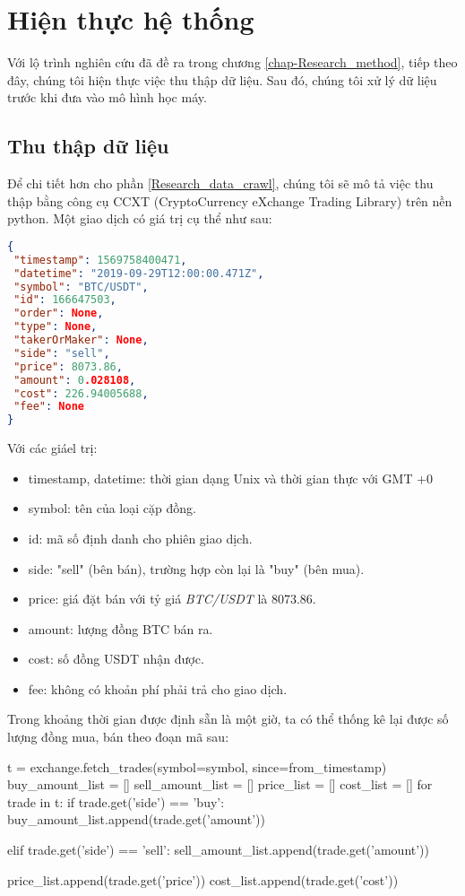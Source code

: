 \chapter{Hiện thực hệ thống}\label{chap:Implement}
Với lộ trình nghiên cứu đã đề ra trong chương \ref{chap-Research_method}, tiếp theo đây, chúng tôi hiện thực việc thu thập dữ liệu. Sau đó, chúng tôi xử lý dữ liệu trước khi đưa vào mô hình học máy.
\section{Thu thập dữ liệu}

Để chi tiết hơn cho phần \ref{Research_data_crawl}, chúng tôi sẽ mô tả việc thu thập bằng công cụ CCXT (CryptoCurrency eXchange Trading Library) trên nền python. Một giao dịch có giá trị cụ thể như sau:

\begin{lstlisting}[language=json,firstnumber=1]
{
 "timestamp": 1569758400471,
 "datetime": "2019-09-29T12:00:00.471Z",
 "symbol": "BTC/USDT",
 "id": 166647503,
 "order": None,
 "type": None,
 "takerOrMaker": None,
 "side": "sell",
 "price": 8073.86,
 "amount": 0.028108,
 "cost": 226.94005688,
 "fee": None
}
\end{lstlisting}
Với các giáel trị:
\begin{itemize}
    \item timestamp, datetime: thời gian dạng Unix và thời gian thực với GMT +0
    \item symbol: tên của loại cặp đồng.
    \item id: mã số định danh cho phiên giao dịch.
    \item side: "sell" (bên bán), trường hợp còn lại là "buy" (bên mua).
    \item price: giá đặt bán với tỷ giá \textit{BTC/USDT} là 8073.86.
    \item amount: lượng đồng BTC bán ra.
    \item cost: số đồng USDT nhận được.
    \item fee: không có khoản phí phải trả cho giao dịch.
\end{itemize}
Trong khoảng thời gian được định sẵn là một giờ, ta có thể thống kê lại được số lượng đồng mua, bán theo đoạn mã sau:

\begin{python}
t = exchange.fetch_trades(symbol=symbol, since=from_timestamp)
buy_amount_list = []
sell_amount_list = []
price_list = []
cost_list = []
for trade in t:
    if trade.get('side') == 'buy':
        buy_amount_list.append(trade.get('amount'))

    elif trade.get('side') == 'sell':
        sell_amount_list.append(trade.get('amount'))
    
    price_list.append(trade.get('price'))
    cost_list.append(trade.get('cost'))
\end{python}



